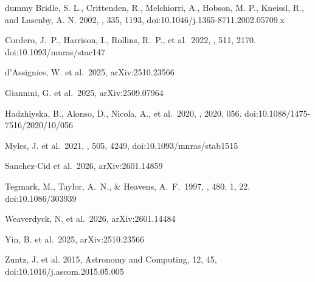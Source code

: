\documentclass[onecolumn,resetfootnote]{aastex7}
\begin{document}
\begin{thebibliography}{dummy}
%
%
Bridle, S. L., Crittenden, R., Melchiorri, A., Hobson, M. P., Kneissl, R., and Lasenby, A. N. 2002, \mnras, 335, 1193, 
doi:10.1046/j.1365-8711.2002.05709.x
 
 Cordero, J.~P., Harrison, I., Rollins, R.~P., et al.\ 2022, \mnras, 511, 2170. doi:10.1093/mnras/stac147

 d'Assignies, W. et al.\ 2025,
arXiv:2510.23566

 Giannini, G. et al.\ 2025, arXiv:2509.07964

 Hadzhiyska, B., Alonso, D., Nicola, A., et al.\ 2020, \jcap, 2020, 056. doi:10.1088/1475-7516/2020/10/056

  Myles, J. et al.\ 2021, \mnras, 505, 4249,
  doi:10.1093/mnras/stab1515
  
 Sanchez-Cid et al.\ 2026,
  arXiv:2601.14859

 Tegmark, M., Taylor, A.~N., \& Heavens,
  A.~F.\ 1997, \apj, 480, 1, 22. doi:10.1086/303939 
  
 Weaverdyck, N. et al.\ 2026, arXiv:2601.14484

 Yin, B. et al.\ 2025, arXiv:2510.23566
  
  Zuntz, J. et al. 2015, Astronomy and Computing, 12, 45,
  doi:10.1016/j.ascom.2015.05.005
\end{thebibliography}

\allauthors
\end{document}
